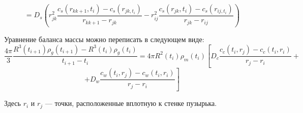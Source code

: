 $$=D_{s}\left(r_{jk}^{2}\frac{c_{s}(r_{kk+1},t_{i})-c_{s}(r_{jk,t_{i}})}{r_{kk+1}-r_{jk}}-r_{ij}^{2}\frac{c_{s}(r_{jk},t_{i})-c_{s}(r_{ij,t_{i}})}{r_{jk}-r_{ij}}\right)$$
\par Уравнение баланса массы можно переписать в следующем виде:
$$\frac{4\pi}{3}\frac{R^{3}(t_{i+1})\rho_{g}(t_{i+1})-R^{3}(t_{i})\rho_{g}(t_{i})}{t_{i+1}-t_{i}}=4\pi R^{2}(t_{i})\rho_{m}(t_{i})\left[D_{c}\frac{c_{c}(t_{i},r_{j})-c_{c}(t_{i},r_{i})}{r_{j}-r_{i}}+\right.$$
$$\left.+D_{w}\frac{c_{w}(t_{i},r_{j})-c_{w}(t_{i},r_{i})}{r_{j}-r_{i}}\right]$$
\par Здесь $r_{i}$ и $r_{j}$ --- точки, расположенные вплотную к стенке пузырька.